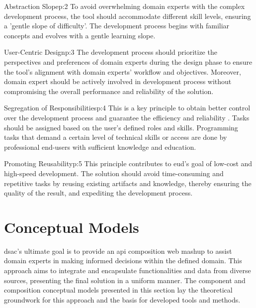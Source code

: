 \begin{thesisprinciple}{Abstraction Slope}{p:2}
To avoid overwhelming domain experts with the complex development process, the tool should accommodate different skill levels, ensuring a 'gentle slope of difficulty'\autocite{Picozzi2013}. The development process begins with familiar concepts and evolves with a gentle learning slope.
\end{thesisprinciple}

\begin{thesisprinciple}{User-Centric Design}{p:3}
The development process should prioritize the perspectives and preferences of domain experts during the design phase to ensure the tool’s alignment with domain experts' workflow and objectives. Moreover, domain expert should be actively involved in development process without compromising the overall performance and reliability of the solution.  
\end{thesisprinciple}

\begin{thesisprinciple}{Segregation of Responsibilities}{p:4}
This is a key principle to obtain better control over the development process and guarantee the efficiency and reliability \autocite{Tschudnowsky2016}. Tasks should be assigned based on the user’s defined roles and skills. Programming tasks that demand a certain level of technical skills or access are done by professional end-users with sufficient knowledge and education. 
\end{thesisprinciple}

\begin{thesisprinciple}{Promoting Reusability}{p:5}
This principle contributes to \gls{eud}'s goal of low-cost and high-speed development. The solution should avoid time-consuming and repetitive tasks by reusing existing artifacts and knowledge, thereby ensuring the quality of the result, and expediting the development process.
\end{thesisprinciple}


\vspace{-10pt}
\hypertarget{sec:conceptual-models}{%
\section{Conceptual Models}\label{sec:conceptual-models}}
\vspace{10pt}

\gls{dsac}'s ultimate goal is to provide an \gls{api} composition web mashup to assist domain experts in making informed decisions within the defined domain. This approach aims to integrate and encapsulate functionalities and data from diverse sources, presenting the final solution in a uniform manner. The component and composition \gls{conceptual model}s presented in this section lay the theoretical groundwork for this approach and the basis for developed tools and methods.

